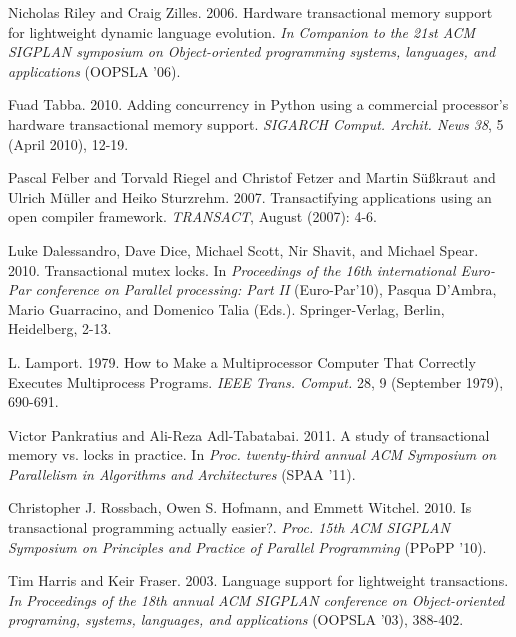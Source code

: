 \documentclass{sigplanconf}
\begin{document}
\begin{thebibliography}{}
  Nicholas Riley and Craig Zilles. 2006. Hardware transactional memory
  support for lightweight dynamic language evolution. \emph{In
    Companion to the 21st ACM SIGPLAN symposium on Object-oriented
    programming systems, languages, and applications} (OOPSLA
  '06).

  Fuad Tabba. 2010. Adding concurrency in Python using a commercial
  processor's hardware transactional memory support. \emph{SIGARCH
  Comput. Archit. News 38}, 5 (April 2010), 12-19.

  Pascal Felber and Torvald Riegel and Christof Fetzer and Martin
  Süßkraut and Ulrich Müller and Heiko Sturzrehm. 2007. Transactifying
  applications using an open compiler framework. \emph{TRANSACT}, August
  (2007): 4-6.


  Luke Dalessandro, Dave Dice, Michael Scott, Nir Shavit, and Michael
  Spear. 2010. Transactional mutex locks. In \emph{Proceedings of the
    16th international Euro-Par conference on Parallel processing: Part
    II} (Euro-Par'10), Pasqua D'Ambra, Mario Guarracino, and Domenico
  Talia (Eds.). Springer-Verlag, Berlin, Heidelberg, 2-13.

  L. Lamport. 1979. How to Make a Multiprocessor Computer That Correctly
  Executes Multiprocess Programs. \emph{IEEE Trans. Comput.} 28, 9
  (September 1979), 690-691.

  Victor Pankratius and Ali-Reza Adl-Tabatabai. 2011. A study of
  transactional memory vs. locks in practice. In \emph{Proc.
     twenty-third annual ACM Symposium on Parallelism in Algorithms
    and Architectures} (SPAA '11).

  Christopher J. Rossbach, Owen S. Hofmann, and Emmett
  Witchel. 2010. Is transactional programming actually
  easier?. \emph{Proc. 15th ACM SIGPLAN Symposium on
    Principles and Practice of Parallel Programming} (PPoPP '10).


  Tim Harris and Keir Fraser. 2003. Language support for lightweight
  transactions. \emph{In Proceedings of the 18th annual ACM SIGPLAN
    conference on Object-oriented programing, systems, languages, and
    applications} (OOPSLA '03), 388-402.


\end{thebibliography}
\end{document}
